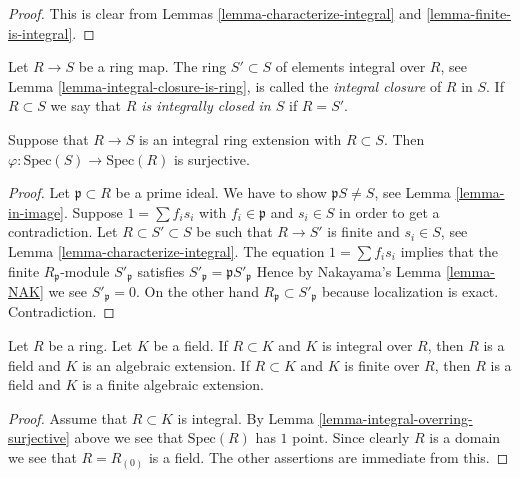 \begin{proof}
This is clear from Lemmas \ref{lemma-characterize-integral}
and \ref{lemma-finite-is-integral}.
\end{proof}

\begin{definition}
\label{definition-integral-closure}
Let $R \to S$ be a ring map.
The ring $S' \subset S$ of elements integral over
$R$, see Lemma \ref{lemma-integral-closure-is-ring},
is called the {\it integral closure} of $R$
in $S$. If $R \subset S$ we say that {\it $R$ is
integrally closed in $S$} if $R = S'$.
\end{definition}

\begin{lemma}
\label{lemma-integral-overring-surjective}
Suppose that $R \to S$ is an integral
ring extension with $R \subset S$.
Then $\varphi : \text{Spec}(S) \to \text{Spec}(R)$
is surjective.
\end{lemma}

\begin{proof}
Let $\mathfrak p \subset R$ be a prime ideal.
We have to show $\mathfrak pS \not = S$, see Lemma \ref{lemma-in-image}.
Suppose $1 = \sum f_i s_i$ with $f_i \in \mathfrak p$
and $s_i \in S$ in order to get a contradiction.
Let $R \subset S' \subset S$
be such that $R\to S'$ is finite and $s_i \in S$,
see Lemma \ref{lemma-characterize-integral}.
The equation $1 = \sum f_i s_i$ implies that
the finite $R_{\mathfrak p}$-module
$S'_{\mathfrak p}$ satisfies
$S'_{\mathfrak p} = \mathfrak pS'_{\mathfrak p}$
Hence by Nakayama's Lemma \ref{lemma-NAK}
we see $S'_{\mathfrak p} = 0$. On the other hand
$R_{\mathfrak p} \subset S'_{\mathfrak p}$ because localization
is exact. Contradiction.
\end{proof}

\begin{lemma}
\label{lemma-integral-under-field}
Let $R$ be a ring. Let $K$ be a field.
If $R \subset K$ and $K$ is integral over $R$,
then $R$ is a field and $K$ is an algebraic extension.
If $R \subset K$ and $K$ is finite over $R$,
then $R$ is a field and $K$ is a finite algebraic extension.
\end{lemma}

\begin{proof}
Assume that $R \subset K$ is integral.
By Lemma \ref{lemma-integral-overring-surjective} above we see that
$\text{Spec}(R)$ has $1$ point. Since clearly $R$ is a domain we see
that $R = R_{(0)}$ is a field. The other assertions are immediate
from this.
\end{proof}

